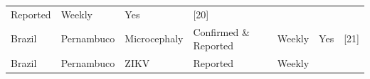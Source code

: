 \documentclass[10pt,letterpaper]{article}
\begin{document}
\begin{longtable}[]{@{}lllllll@{}}
\begin{minipage}[t]{0.17\columnwidth}
Reported\strut
\end{minipage} & \begin{minipage}[t]{0.04\columnwidth}\raggedright\strut
Weekly\strut
\end{minipage} & \begin{minipage}[t]{0.04\columnwidth}\raggedright\strut
Yes\strut
\end{minipage} & \begin{minipage}[t]{0.08\columnwidth}\raggedright\strut
{[}20{]}\strut
\end{minipage}\tabularnewline
\begin{minipage}[t]{0.03\columnwidth}\raggedright\strut
Brazil\strut
\end{minipage} & \begin{minipage}[t]{0.37\columnwidth}\raggedright\strut
Pernambuco\strut
\end{minipage} & \begin{minipage}[t]{0.08\columnwidth}\raggedright\strut
Microcephaly\strut
\end{minipage} & \begin{minipage}[t]{0.17\columnwidth}\raggedright\strut
Confirmed \& Reported\strut
\end{minipage} & \begin{minipage}[t]{0.04\columnwidth}\raggedright\strut
Weekly\strut
\end{minipage} & \begin{minipage}[t]{0.04\columnwidth}\raggedright\strut
Yes\strut
\end{minipage} & \begin{minipage}[t]{0.08\columnwidth}\raggedright\strut
{[}21{]}\strut
\end{minipage}\tabularnewline
\begin{minipage}[t]{0.03\columnwidth}\raggedright\strut
Brazil\strut
\end{minipage} & \begin{minipage}[t]{0.37\columnwidth}\raggedright\strut
Pernambuco\strut
\end{minipage} & \begin{minipage}[t]{0.08\columnwidth}\raggedright\strut
ZIKV\strut
\end{minipage} & \begin{minipage}[t]{0.17\columnwidth}\raggedright\strut
Reported\strut
\end{minipage} & \begin{minipage}[t]{0.04\columnwidth}\raggedright\strut
Weekly\strut
\end{minipage} & \begin{minipage}[t]{0.04\columnwidth}\raggedright\strut

\end{minipage}
\end{longtable}
\end{document}
